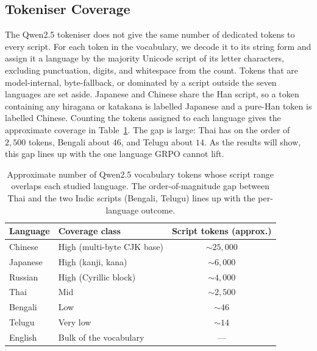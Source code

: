 \subsection{Tokeniser Coverage}
\label{subsec:grpo-coverage}

The Qwen2.5 tokeniser does not give the same number of dedicated tokens to every
script. For each token in the vocabulary, we decode it to its string form and
assign it a language by the majority Unicode script of its letter characters,
excluding punctuation, digits, and whitespace from the count. Tokens that are
model-internal, byte-fallback, or dominated by a script outside the seven
languages are set aside. Japanese and Chinese share the Han script, so a token
containing any hiragana or katakana is labelled Japanese and a pure-Han token is
labelled Chinese. Counting the tokens assigned to each language gives the
approximate coverage in Table~\ref{tab:grpo-coverage}. The gap is large: Thai has
on the order of $2{,}500$ tokens, Bengali about $46$, and Telugu about $14$. As
the results will show, this gap lines up with the one language GRPO cannot lift.

\begin{table}[t]
	\centering
	\renewcommand{\arraystretch}{1.2}
	\begin{tabular}{llc}
		\toprule
		\textbf{Language} & \textbf{Coverage class} & \textbf{Script tokens (approx.)} \\
		\midrule
		Chinese  & High (multi-byte CJK base) & $\sim 25{,}000$ \\
		Japanese & High (kanji, kana)         & $\sim 6{,}000$  \\
		Russian  & High (Cyrillic block)      & $\sim 4{,}000$  \\
		Thai     & Mid                        & $\sim 2{,}500$  \\
		Bengali  & Low                        & $\sim 46$       \\
		Telugu   & Very low                   & $\sim 14$       \\
		English  & Bulk of the vocabulary     & ---             \\
		\bottomrule
	\end{tabular}
	\caption{Approximate number of Qwen2.5 vocabulary tokens whose script range
		overlaps each studied language. The order-of-magnitude gap between Thai and the
		two Indic scripts (Bengali, Telugu) lines up with the per-language outcome.}
	\label{tab:grpo-coverage}
\end{table}

